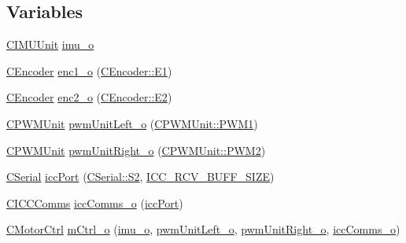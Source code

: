 \subsection*{Variables}
\begin{DoxyCompactItemize}
\item 
\mbox{\hyperlink{class_c_i_m_u_unit}{C\+I\+M\+U\+Unit}} \mbox{\hyperlink{_a_d_a_s___m_c_u_8ino_ae51e36f83228f859afeb8a72e60339a6}{imu\+\_\+o}}
\item 
\mbox{\hyperlink{class_c_encoder}{C\+Encoder}} \mbox{\hyperlink{_a_d_a_s___m_c_u_8ino_ad90699f8fbb0fa8f734ae5c30885ee3b}{enc1\+\_\+o}} (\mbox{\hyperlink{class_c_encoder_a49810cc352199fb02a60e2ef8ac6cbc3a8f0ceb6874e0c79b53bf26fa42a1b652}{C\+Encoder\+::\+E1}})
\item 
\mbox{\hyperlink{class_c_encoder}{C\+Encoder}} \mbox{\hyperlink{_a_d_a_s___m_c_u_8ino_a54cfc96aae4913b87ab356a0665557a5}{enc2\+\_\+o}} (\mbox{\hyperlink{class_c_encoder_a49810cc352199fb02a60e2ef8ac6cbc3aaa314a69656e242defabd33eb8e90284}{C\+Encoder\+::\+E2}})
\item 
\mbox{\hyperlink{class_c_p_w_m_unit}{C\+P\+W\+M\+Unit}} \mbox{\hyperlink{_a_d_a_s___m_c_u_8ino_a10a570a59ef56c08699c4fec61d47d16}{pwm\+Unit\+Left\+\_\+o}} (\mbox{\hyperlink{class_c_p_w_m_unit_ad3e55d1df0367d8a090d4b835704be44a3f6167a7882e80f1ad05c8bff5e538c0}{C\+P\+W\+M\+Unit\+::\+P\+W\+M1}})
\item 
\mbox{\hyperlink{class_c_p_w_m_unit}{C\+P\+W\+M\+Unit}} \mbox{\hyperlink{_a_d_a_s___m_c_u_8ino_a49af1ef8724d9cb785e37641bb0cdc6b}{pwm\+Unit\+Right\+\_\+o}} (\mbox{\hyperlink{class_c_p_w_m_unit_ad3e55d1df0367d8a090d4b835704be44afc7888ea63be5da5551d10db3d676185}{C\+P\+W\+M\+Unit\+::\+P\+W\+M2}})
\item 
\mbox{\hyperlink{class_c_serial}{C\+Serial}} \mbox{\hyperlink{_a_d_a_s___m_c_u_8ino_ad1e6d9fed4369104e412a46c019634d2}{icc\+Port}} (\mbox{\hyperlink{class_c_serial_a000039540cc90b18bafacf5744e7eda2a8cc95f4591147b0df028e003f82220a1}{C\+Serial\+::\+S2}}, \mbox{\hyperlink{_a_d_a_s___cfg_8h_abf41bed56ee0b2a8858687c4420bb110}{I\+C\+C\+\_\+\+R\+C\+V\+\_\+\+B\+U\+F\+F\+\_\+\+S\+I\+ZE}})
\item 
\mbox{\hyperlink{class_c_i_c_c_comms}{C\+I\+C\+C\+Comms}} \mbox{\hyperlink{_a_d_a_s___m_c_u_8ino_a62ef6b3308259edb69af585549178324}{icc\+Comms\+\_\+o}} (\mbox{\hyperlink{_a_d_a_s___m_c_u_8ino_ad1e6d9fed4369104e412a46c019634d2}{icc\+Port}})
\item 
\mbox{\hyperlink{class_c_motor_ctrl}{C\+Motor\+Ctrl}} \mbox{\hyperlink{_a_d_a_s___m_c_u_8ino_ab618fa643b3224c905b4fcbd074fb481}{m\+Ctrl\+\_\+o}} (\mbox{\hyperlink{_a_d_a_s___m_c_u_8ino_ae51e36f83228f859afeb8a72e60339a6}{imu\+\_\+o}}, \mbox{\hyperlink{_a_d_a_s___m_c_u_8ino_a10a570a59ef56c08699c4fec61d47d16}{pwm\+Unit\+Left\+\_\+o}}, \mbox{\hyperlink{_a_d_a_s___m_c_u_8ino_a49af1ef8724d9cb785e37641bb0cdc6b}{pwm\+Unit\+Right\+\_\+o}}, \mbox{\hyperlink{_a_d_a_s___m_c_u_8ino_a62ef6b3308259edb69af585549178324}{icc\+Comms\+\_\+o}})
\end{DoxyCompactItemize}


